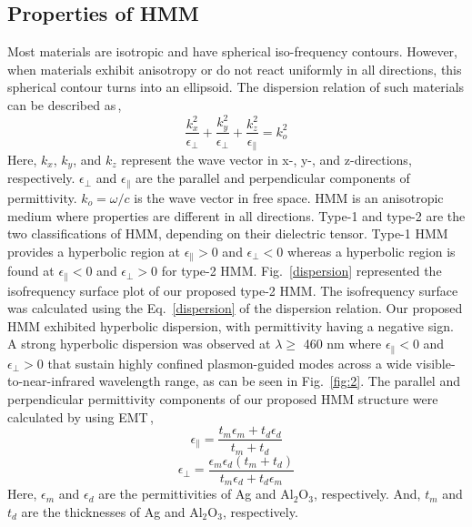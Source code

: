 \documentclass[conference]{IEEEtran}
\begin{document}
\subsection{Properties of HMM}
Most materials are isotropic and have spherical iso-frequency contours. However, when materials exhibit anisotropy or do not react uniformly in all directions, this spherical contour turns into an ellipsoid. The dispersion relation of such materials can be described as\,\cite{HMM book},
\begin{equation}
    \frac{k_x^2}{\epsilon_{\perp}} + \frac{k_y^2}{\epsilon_{\perp}} + \frac{k_z^2}{\epsilon_{\parallel}} = k_o^2
    \label{Eq. hp1}
\end{equation}
Here,  $k_x$, $k_y$, and $k_z$ represent the wave vector in x-, y-, and z-directions, respectively. $\epsilon_{\perp}$ and $\epsilon_{\parallel}$ are the parallel and perpendicular components of permittivity. $k_o = \omega/c$ is the wave vector in free space. HMM is an anisotropic medium where properties are different in all directions. Type-1 and type-2 are the two classifications of HMM, depending on their dielectric tensor. Type-1 HMM provides a hyperbolic region at $\epsilon_{\parallel}>0$ and $\epsilon_{\bot}<0$ whereas a hyperbolic region is found at $\epsilon_{\parallel}<0$ and $\epsilon_{\bot}>0$ for type-2 HMM. Fig.~\ref{dispersion} represented the isofrequency surface plot of our proposed type-2 HMM. The isofrequency surface was calculated using the Eq.~\ref{dispersion} of the dispersion relation. Our proposed HMM exhibited hyperbolic dispersion, with permittivity having a negative sign. A strong hyperbolic dispersion was observed at $\lambda \geq$ 460 nm where $\epsilon_{\parallel}<0$ and $\epsilon_{\bot}>0$ that sustain highly confined plasmon-guided modes across a wide visible-to-near-infrared wavelength range, as can be seen in Fig.~\ref{fig:2}. The parallel and perpendicular permittivity components of our proposed HMM structure were calculated by using EMT\,\cite{jacob}, 
\begin{equation}
    \epsilon_{\parallel} = \frac{t_m \epsilon_m + t_d \epsilon_d}{t_m + t_d}
    \label{Eq. 3}
\end{equation}
\begin{equation}
    \epsilon_{\perp} = \frac{\epsilon_m \epsilon_d (t_m + t_d)}{t_m \epsilon_d + t_d \epsilon_m}
    \label{Eq. 4}
\end{equation}
Here, $\epsilon_m$ and $\epsilon_d$ are the permittivities of Ag and Al$_2$O$_3$, respectively. And, $t_m$ and $t_d$ are the thicknesses of Ag and Al$_2$O$_3$, respectively. 
\end{document}
